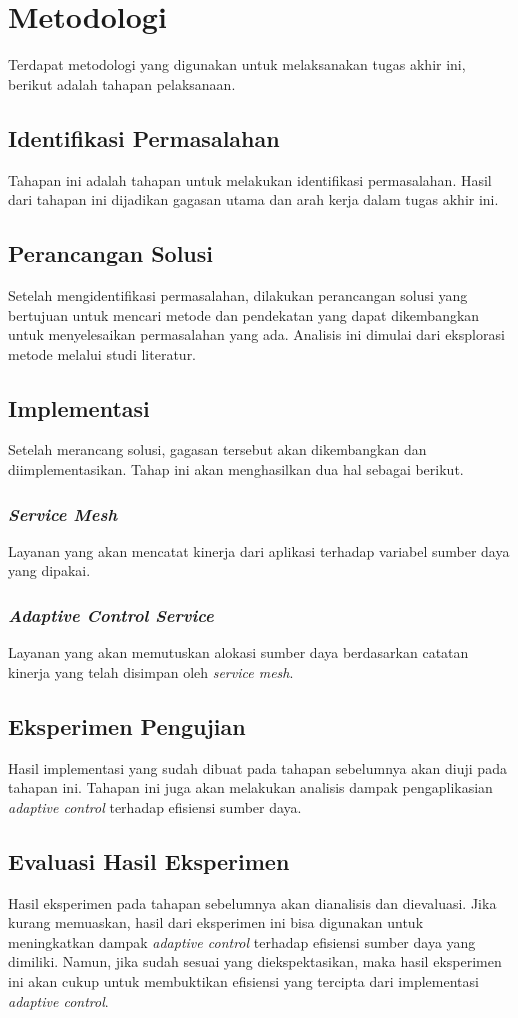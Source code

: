 \section{Metodologi}

Terdapat metodologi yang digunakan untuk melaksanakan tugas akhir ini, berikut adalah tahapan pelaksanaan.
\subsection{Identifikasi Permasalahan}
Tahapan ini adalah tahapan untuk melakukan identifikasi permasalahan. Hasil dari tahapan ini dijadikan gagasan utama dan arah kerja dalam tugas akhir ini.
\subsection{Perancangan Solusi}
Setelah mengidentifikasi permasalahan, dilakukan perancangan solusi yang bertujuan untuk mencari metode dan pendekatan yang dapat dikembangkan untuk menyelesaikan permasalahan yang ada. Analisis ini dimulai dari eksplorasi metode melalui studi literatur.
\subsection{Implementasi}
Setelah merancang solusi, gagasan tersebut akan dikembangkan dan diimplementasikan. Tahap ini akan menghasilkan dua hal sebagai berikut.
\subsubsection{\textit{Service Mesh}}
Layanan yang akan mencatat kinerja dari aplikasi terhadap variabel sumber daya yang dipakai.
\subsubsection{\textit{Adaptive Control Service}}
Layanan yang akan memutuskan alokasi sumber daya berdasarkan catatan kinerja yang telah disimpan oleh \textit{service mesh}.
\subsection{Eksperimen Pengujian}
Hasil implementasi yang sudah dibuat pada tahapan sebelumnya akan diuji pada tahapan ini. Tahapan ini juga akan melakukan analisis dampak pengaplikasian \textit{adaptive control} terhadap efisiensi sumber daya.
\subsection{Evaluasi Hasil Eksperimen}
Hasil eksperimen pada tahapan sebelumnya akan dianalisis dan dievaluasi. Jika kurang memuaskan, hasil dari eksperimen ini bisa digunakan untuk meningkatkan dampak \textit{adaptive control} terhadap efisiensi sumber daya yang dimiliki. Namun, jika sudah sesuai yang diekspektasikan, maka hasil eksperimen ini akan cukup untuk membuktikan efisiensi yang tercipta dari implementasi \textit{adaptive control}.

